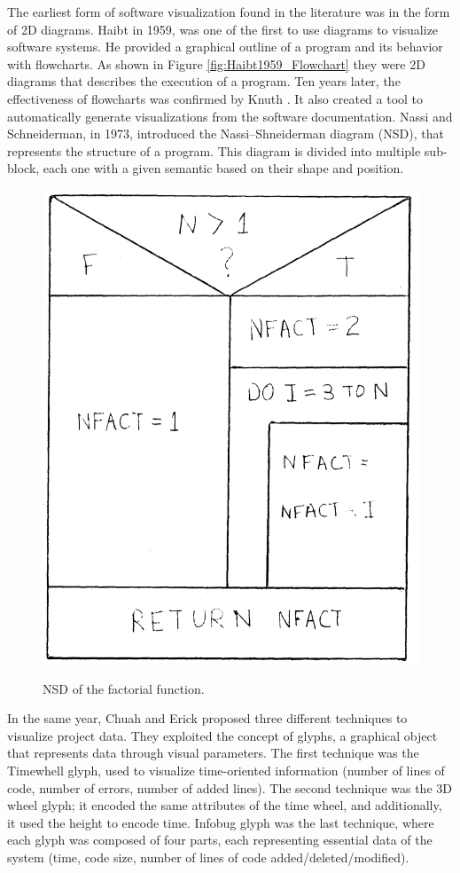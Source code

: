 The earliest form of software visualization found in the literature was in the form of 2D diagrams. 
Haibt \cite{Haibt1959} in 1959, was one of the first to use diagrams to visualize software systems. 
He provided a graphical outline of a program and its behavior with flowcharts. As shown in Figure \ref{fig:Haibt1959_Flowchart} they 
were 2D diagrams that describes the execution of a program. 
Ten years later, the effectiveness of flowcharts was confirmed by Knuth \cite{Knuth1963}. It also created a tool to automatically generate visualizations from the software documentation. 
Nassi and Schneiderman\cite{Nassi1973}, in 1973, introduced the Nassi–Shneiderman diagram (NSD), that represents the structure of a program. 
This diagram is divided into multiple sub-block, each one with a given semantic based on their shape and position. \newpage


\begin{figure}
  \includegraphics[width=0.4\linewidth]{Nassi1973_NSD.png}
  \label{fig:Nassi1973_NSD}
  \caption{NSD of the factorial function.}
\end{figure}



In the same year, Chuah and Erick \cite{Chuah1998} proposed three different techniques to visualize project data. 
They exploited the concept of glyphs, a graphical object that represents data through visual parameters. 
The first technique was the Timewhell glyph, used to visualize time-oriented information (number of lines of code, number of errors, number of added lines). 
The second technique was the 3D wheel glyph; it encoded the same attributes of the time wheel, and additionally, it used the height to encode time. 
Infobug glyph was the last technique, where each glyph was composed of four parts, each representing essential data of the system (time, code size, number of lines of code added/deleted/modified). \newline

